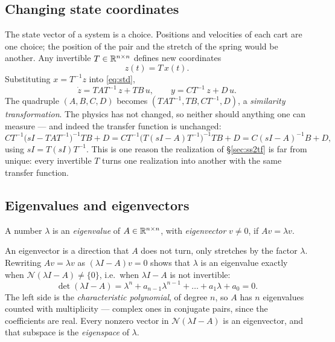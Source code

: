 \documentclass[11pt]{article}
\begin{document}
\subsection{Changing state coordinates}\label{sec:similarity}
The state vector of a system is a choice. Positions and velocities of each cart
are one choice; the position of the pair and the stretch of the spring would be
another. Any invertible $T\in\mathbb{R}^{n\times n}$ defines new coordinates
\[
   z(t) = T\,x(t) .
\]
Substituting $x=T^{-1}z$ into \eqref{eq:std},
\begin{equation}\label{eq:simtransform}
   \dot z = TAT^{-1}\,z + TB\,u, \qquad y = CT^{-1}\,z + D\,u .
\end{equation}
The quadruple $(A,B,C,D)$ becomes $(TAT^{-1},TB,CT^{-1},D)$, a
\emph{similarity transformation}. The physics has not changed, so neither should
anything one can measure --- and indeed the transfer function is unchanged:
\[
   CT^{-1}\bigl(sI-TAT^{-1}\bigr)^{-1}TB + D
   = CT^{-1}\bigl(T(sI-A)T^{-1}\bigr)^{-1}TB + D
   = C(sI-A)^{-1}B + D ,
\]
using $sI=T(sI)T^{-1}$. This is one reason the realization of
\S\ref{sec:ss2tf} is far from unique: every invertible $T$ turns one realization
into another with the same transfer function.

\subsection{Eigenvalues and eigenvectors}
\begin{definition}
A number $\lambda$ is an \emph{eigenvalue} of $A\in\mathbb{R}^{n\times n}$, with
\emph{eigenvector} $v\neq0$, if $Av=\lambda v$.
\end{definition}
An eigenvector is a direction that $A$ does not turn, only stretches by the factor
$\lambda$. Rewriting $Av=\lambda v$ as $(\lambda I-A)v=0$ shows that $\lambda$ is an
eigenvalue exactly when $\mathcal N(\lambda I-A)\neq\{0\}$, i.e.\ when $\lambda I-A$
is not invertible:
\begin{equation}\label{eq:charpoly}
   \det(\lambda I-A) = \lambda^{n}+a_{n-1}\lambda^{n-1}+\dots+a_1\lambda+a_0 = 0 .
\end{equation}
The left side is the \emph{characteristic polynomial}, of degree $n$, so $A$ has
$n$ eigenvalues counted with multiplicity --- complex ones in conjugate pairs,
since the coefficients are real. Every nonzero vector in
$\mathcal N(\lambda I-A)$ is an eigenvector, and that subspace is the
\emph{eigenspace} of $\lambda$.
\end{document}
